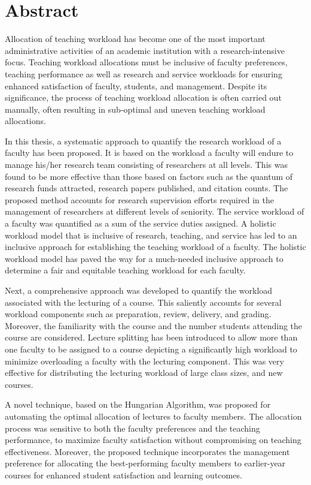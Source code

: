 \chapter*{Abstract}

Allocation of teaching workload has become one of the most important administrative activities of an academic institution with a research-intensive focus. Teaching workload allocations must be inclusive of faculty preferences, teaching performance as well as research and service workloads for ensuring enhanced satisfaction of faculty, students, and management. Despite its significance, the process of teaching workload allocation is often carried out manually, often resulting in sub-optimal and uneven teaching workload allocations.

In this thesis, a systematic approach to quantify the research workload of a faculty has been proposed. It is based on the workload a faculty will endure to manage his/her research team consisting of researchers at all levels. This was found to be more effective than those based on factors such as the quantum of research funds attracted, research papers published, and citation counts. The proposed method accounts for research supervision efforts required in the management of researchers at different levels of seniority. The service workload of a faculty was quantified as a sum of the service duties assigned. A holistic workload model that is inclusive of research, teaching, and service has led to an inclusive approach for establishing the teaching workload of a faculty. The holistic workload model has paved the way for a much-needed inclusive approach to determine a fair and equitable teaching workload for each faculty.

Next, a comprehensive approach was developed to quantify the workload associated with the lecturing of a course. This saliently accounts for several workload components such as preparation, review, delivery, and grading. Moreover, the familiarity with the course and the number students attending the course are considered. Lecture splitting has been introduced to allow more than one faculty to be assigned to a course depicting a significantly high workload to minimize overloading a faculty with the lecturing component. This was very effective for distributing the lecturing workload of large class sizes, and new courses.

A novel technique, based on the Hungarian Algorithm, was proposed for automating the optimal allocation of lectures to faculty members. The allocation process was sensitive to both the faculty preferences and the teaching performance, to maximize faculty satisfaction without compromising on teaching effectiveness. Moreover, the proposed technique incorporates the management preference for allocating the best-performing faculty members to earlier-year courses for enhanced student satisfaction and learning outcomes.

